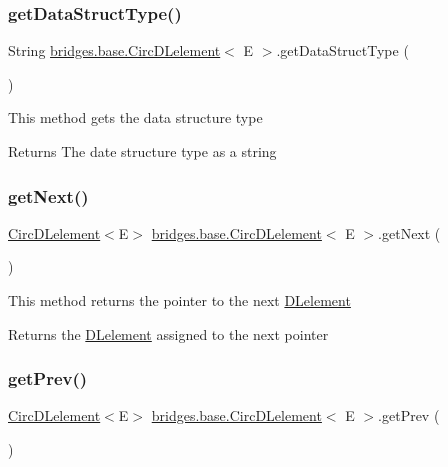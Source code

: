 \subsubsection{\texorpdfstring{get\+Data\+Struct\+Type()}{getDataStructType()}}
{\footnotesize\ttfamily String \hyperlink{classbridges_1_1base_1_1_circ_d_lelement}{bridges.\+base.\+Circ\+D\+Lelement}$<$ E $>$.get\+Data\+Struct\+Type (\begin{DoxyParamCaption}{ }\end{DoxyParamCaption})}

This method gets the data structure type

\begin{DoxyReturn}{Returns}
The date structure type as a string 
\end{DoxyReturn}
\hypertarget{classbridges_1_1base_1_1_circ_d_lelement_a9ace56dde1f4c23e9a8798c045100ee6}{}\label{classbridges_1_1base_1_1_circ_d_lelement_a9ace56dde1f4c23e9a8798c045100ee6} 
\subsubsection{\texorpdfstring{get\+Next()}{getNext()}}
{\footnotesize\ttfamily \hyperlink{classbridges_1_1base_1_1_circ_d_lelement}{Circ\+D\+Lelement}$<$E$>$ \hyperlink{classbridges_1_1base_1_1_circ_d_lelement}{bridges.\+base.\+Circ\+D\+Lelement}$<$ E $>$.get\+Next (\begin{DoxyParamCaption}{ }\end{DoxyParamCaption})}

This method returns the pointer to the next \hyperlink{classbridges_1_1base_1_1_d_lelement}{D\+Lelement}

\begin{DoxyReturn}{Returns}
the \hyperlink{classbridges_1_1base_1_1_d_lelement}{D\+Lelement} assigned to the next pointer 
\end{DoxyReturn}
\hypertarget{classbridges_1_1base_1_1_circ_d_lelement_aa2b83017a571694460f77dd31b4188ed}{}\label{classbridges_1_1base_1_1_circ_d_lelement_aa2b83017a571694460f77dd31b4188ed} 
\subsubsection{\texorpdfstring{get\+Prev()}{getPrev()}}
{\footnotesize\ttfamily \hyperlink{classbridges_1_1base_1_1_circ_d_lelement}{Circ\+D\+Lelement}$<$E$>$ \hyperlink{classbridges_1_1base_1_1_circ_d_lelement}{bridges.\+base.\+Circ\+D\+Lelement}$<$ E $>$.get\+Prev (\begin{DoxyParamCaption}{ }\end{DoxyParamCaption})}

